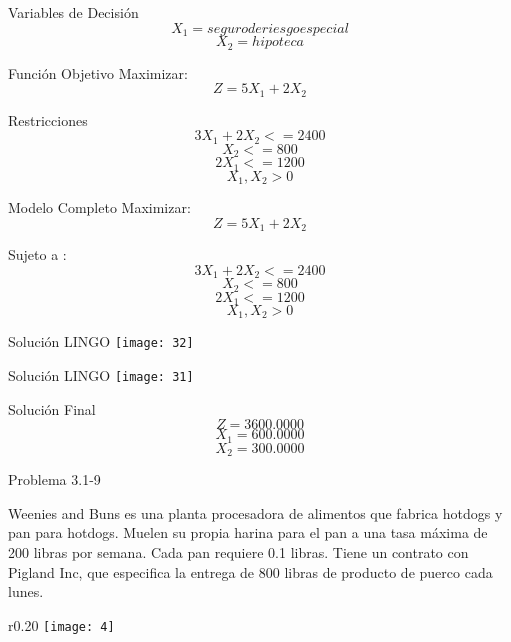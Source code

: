 \documentclass{beamer}
\begin{document}
\begin{frame}[fragile]{Variables de Decisi\'on}
\[X_{1} = seguro de riesgo especial\]
\[X_{2} = hipoteca\]

\end{frame}

\begin{frame}[fragile]{Funci\'on Objetivo}
Maximizar:\\
\[Z = 5X_{1} + 2X_{2}\]
\end{frame}

\begin{frame}[fragile]{Restricciones}
\[3X_{1} + 2X_{2} <= 2400\]
\[X_{2} <= 800\]
\[2X_{1} <= 1200\]
\[X_{1}, X_{2} > 0\]

\end{frame}

\begin{frame}[fragile]{Modelo Completo}
Maximizar:\\
\[Z = 5X_{1} + 2X_{2}\]

Sujeto a :\\
\[3X_{1} + 2X_{2} <= 2400\]
\[X_{2} <= 800\]
\[2X_{1} <= 1200\]
\[X_{1}, X_{2} > 0\]
\end{frame}

\begin{frame}[fragile]{Soluci\'on LINGO}
    \texttt{[image: 32]}
\end{frame}
\begin{frame}[fragile]{Soluci\'on LINGO}
    \texttt{[image: 31]}
\end{frame}

\begin{frame}[fragile]{Soluci\'on Final}
\[Z = 3 600.0000\]
\[X_{1} = 600.0000\]
\[X_{2} = 300.0000\]
\end{frame}

\begin{frame}[t,fragile]{Problema  3.1-9}

Weenies and Buns es una planta procesadora de alimentos que fabrica hotdogs y pan para hotdogs. Muelen su propia harina para el pan a una tasa m\'axima de 200 libras por semana. Cada pan requiere 0.1 libras. Tiene un contrato con Pigland Inc, que especifica la entrega de 800 libras de producto de puerco cada lunes.
\begin{wrapfigure}{r}{0.20\textwidth}
    \centering
    \texttt{[image: 4]}
\end{wrapfigure}
\end{frame}
\end{document}
